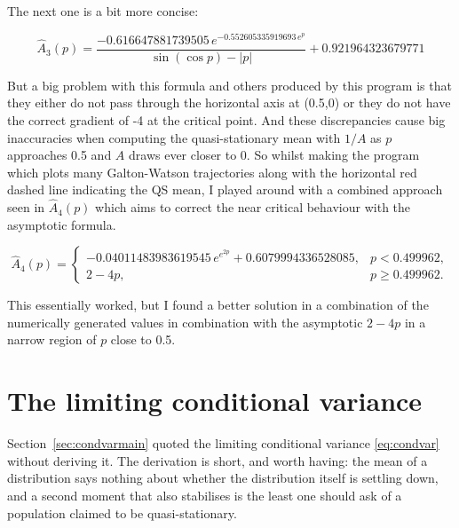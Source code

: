 \noindent
The next one is a bit more concise:

\[
\hat A_3(p)  = \frac{-0.616647881739505 \, e^{-0.552605335919693 \, e^p}}{\sin(\cos p) - |p|} + 0.921964323679771
\]

\noindent
But a big problem with this formula and others produced by this program is that they either do not pass through the horizontal axis at (0.5,0) or they do not have the correct gradient of -4 at the critical point. And these discrepancies cause big inaccuracies when computing the quasi-stationary mean with $1/A$ as $p$ approaches 0.5 and $A$ draws ever closer to 0. So whilst making the program which plots many Galton-Watson trajectories along with the horizontal red dashed line indicating the QS mean, I played around with a combined approach seen in $\hat A_4(p)$ which aims to correct the near critical behaviour with the asymptotic formula. 


\[
\hat A_4(p) = 
\begin{cases}
-0.04011483983619545\, e^{e^{2p}} + 0.6079994336528085, & p < 0.499962,\\[2mm]
2 - 4p, & p \ge 0.499962.
\end{cases}
\]


\noindent
This essentially worked, but I found a better solution in a combination of the numerically generated values in combination with the asymptotic $2-4p$ in a narrow region of $p$ close to 0.5.



\section{The limiting conditional variance}
\label{app:condvar}

Section~\ref{sec:condvarmain} quoted the limiting conditional variance \eqref{eq:condvar} without deriving it. The derivation is short, and worth having: the mean of a distribution says nothing about whether the distribution itself is settling down, and a second moment that also stabilises is the least one should ask of a population claimed to be quasi-stationary.

